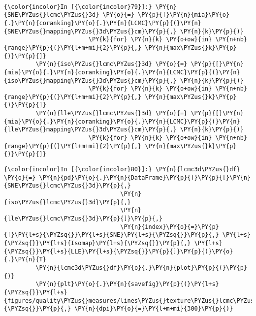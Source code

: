     \begin{center}
    \end{center}
    { \hspace*{\fill} \\}

    \begin{Verbatim}[commandchars=\\\{\}]
{\color{incolor}In [{\color{incolor}79}]:} \PY{n}{SNE\PYZus{}lcmc\PYZus{}3d} \PY{o}{=} \PY{p}{[}\PY{n}{mia}\PY{o}{.}\PY{n}{coranking}\PY{o}{.}\PY{n}{LCMC}\PY{p}{(}\PY{n}{SNE\PYZus{}mapping\PYZus{}3d\PYZus{}cm}\PY{p}{,} \PY{n}{k}\PY{p}{)}
                        \PY{k}{for} \PY{n}{k} \PY{o+ow}{in} \PY{n+nb}{range}\PY{p}{(}\PY{l+m+mi}{2}\PY{p}{,} \PY{n}{max\PYZus{}k}\PY{p}{)}\PY{p}{]}
         \PY{n}{iso\PYZus{}lcmc\PYZus{}3d} \PY{o}{=} \PY{p}{[}\PY{n}{mia}\PY{o}{.}\PY{n}{coranking}\PY{o}{.}\PY{n}{LCMC}\PY{p}{(}\PY{n}{iso\PYZus{}mapping\PYZus{}3d\PYZus{}cm}\PY{p}{,} \PY{n}{k}\PY{p}{)}
                        \PY{k}{for} \PY{n}{k} \PY{o+ow}{in} \PY{n+nb}{range}\PY{p}{(}\PY{l+m+mi}{2}\PY{p}{,} \PY{n}{max\PYZus{}k}\PY{p}{)}\PY{p}{]}
         \PY{n}{lle\PYZus{}lcmc\PYZus{}3d} \PY{o}{=} \PY{p}{[}\PY{n}{mia}\PY{o}{.}\PY{n}{coranking}\PY{o}{.}\PY{n}{LCMC}\PY{p}{(}\PY{n}{lle\PYZus{}mapping\PYZus{}3d\PYZus{}cm}\PY{p}{,} \PY{n}{k}\PY{p}{)}
                        \PY{k}{for} \PY{n}{k} \PY{o+ow}{in} \PY{n+nb}{range}\PY{p}{(}\PY{l+m+mi}{2}\PY{p}{,} \PY{n}{max\PYZus{}k}\PY{p}{)}\PY{p}{]}
\end{Verbatim}

    \begin{Verbatim}[commandchars=\\\{\}]
{\color{incolor}In [{\color{incolor}80}]:} \PY{n}{lcmc3d\PYZus{}df} \PY{o}{=} \PY{n}{pd}\PY{o}{.}\PY{n}{DataFrame}\PY{p}{(}\PY{p}{[}\PY{n}{SNE\PYZus{}lcmc\PYZus{}3d}\PY{p}{,}
                                 \PY{n}{iso\PYZus{}lcmc\PYZus{}3d}\PY{p}{,}
                                 \PY{n}{lle\PYZus{}lcmc\PYZus{}3d}\PY{p}{]}\PY{p}{,}
                                 \PY{n}{index}\PY{o}{=}\PY{p}{[}\PY{l+s}{\PYZsq{}}\PY{l+s}{SNE}\PY{l+s}{\PYZsq{}}\PY{p}{,} \PY{l+s}{\PYZsq{}}\PY{l+s}{Isomap}\PY{l+s}{\PYZsq{}}\PY{p}{,} \PY{l+s}{\PYZsq{}}\PY{l+s}{LLE}\PY{l+s}{\PYZsq{}}\PY{p}{]}\PY{p}{)}\PY{o}{.}\PY{n}{T}
         \PY{n}{lcmc3d\PYZus{}df}\PY{o}{.}\PY{n}{plot}\PY{p}{(}\PY{p}{)}
         \PY{n}{plt}\PY{o}{.}\PY{n}{savefig}\PY{p}{(}\PY{l+s}{\PYZsq{}}\PY{l+s}{figures/quality\PYZus{}measures/lines\PYZus{}texture\PYZus{}lcmc\PYZus{}3d.png}\PY{l+s}{\PYZsq{}}\PY{p}{,} \PY{n}{dpi}\PY{o}{=}\PY{l+m+mi}{300}\PY{p}{)}
\end{Verbatim}

    \begin{center}
    \end{center}
    { \hspace*{\fill} \\}

